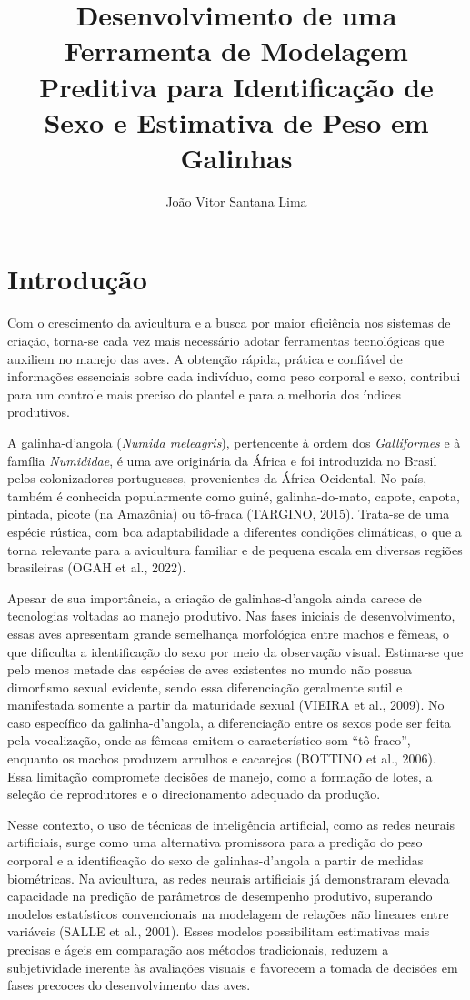 \documentclass[12pt]{article}
\title{Desenvolvimento de uma Ferramenta de Modelagem Preditiva para
  Identificação de Sexo e Estimativa de Peso em Galinhas}
\author{João Vitor Santana Lima\inst{1}}
\begin{document}
\maketitle

\section{Introdução}

Com o crescimento da avicultura e a busca por maior eficiência nos sistemas de
criação, torna-se cada vez mais necessário adotar ferramentas tecnológicas que
auxiliem no manejo das aves. A obtenção rápida, prática e confiável de
informações essenciais sobre cada indivíduo, como peso corporal e sexo,
contribui para um controle mais preciso do plantel e para a melhoria dos
índices produtivos.

A galinha-d'angola (\textit{Numida meleagris}), pertencente à ordem dos
\textit{Galliformes} e à família \textit{Numididae}, é uma ave originária da
África e foi introduzida no Brasil pelos colonizadores portugueses,
provenientes da África Ocidental. No país, também é conhecida popularmente como
guiné, galinha-do-mato, capote, capota, pintada, picote (na Amazônia) ou
tô-fraca (TARGINO, 2015). Trata-se de uma espécie rústica, com boa
adaptabilidade a diferentes condições climáticas, o que a torna relevante para
a avicultura familiar e de pequena escala em diversas regiões brasileiras
(OGAH et al., 2022).

Apesar de sua importância, a criação de galinhas-d'angola ainda carece de
tecnologias voltadas ao manejo produtivo. Nas fases iniciais de
desenvolvimento, essas aves apresentam grande semelhança morfológica entre
machos e fêmeas, o que dificulta a identificação do sexo por meio da observação
visual. Estima-se que pelo menos metade das espécies de aves existentes no
mundo não possua dimorfismo sexual evidente, sendo essa diferenciação
geralmente sutil e manifestada somente a partir da maturidade sexual (VIEIRA et
al., 2009). No caso específico da galinha-d'angola, a diferenciação entre os
sexos pode ser feita pela vocalização, onde as fêmeas emitem o característico
som ``tô-fraco'', enquanto os machos produzem arrulhos e cacarejos (BOTTINO et
al., 2006). Essa limitação compromete decisões de manejo, como a formação de
lotes, a seleção de reprodutores e o direcionamento adequado da produção.

Nesse contexto, o uso de técnicas de inteligência artificial, como as redes
neurais artificiais, surge como uma alternativa promissora para a predição do
peso corporal e a identificação do sexo de galinhas-d'angola a partir de
medidas biométricas. Na avicultura, as redes neurais artificiais já
demonstraram elevada capacidade na predição de parâmetros de desempenho
produtivo, superando modelos estatísticos convencionais na modelagem de
relações não lineares entre variáveis (SALLE et al., 2001). Esses modelos
possibilitam estimativas mais precisas e ágeis em comparação aos métodos
tradicionais, reduzem a subjetividade inerente às avaliações visuais e
favorecem a tomada de decisões em fases precoces do desenvolvimento das aves.
\end{document}
